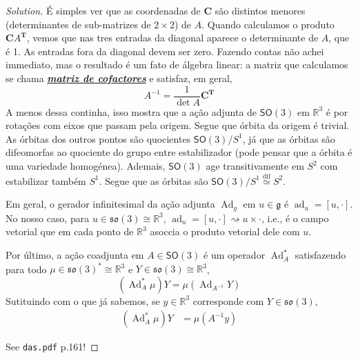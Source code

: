 \begin{proof}[Solution]
É simples ver que as coordenadas de $\mathbf{C}$ são distintos menores (determinantes de sub-matrizes de $2\times 2$) de $A$. Quando calculamos o produto $\mathbf{C} A^{\mathbf{T}}$, vemos que nas tres entradas da diagonal aparece o determinante de $A$, que é 1. As entradas fora da diagonal devem ser zero. Fazendo contas não achei immediato, mas o resultado é um fato de álgebra linear: a matriz que calculamos se chama \href{https://en.wikipedia.org/wiki/Minor_(linear_algebra)#Cofactor_expansion_of_the_determinant}{\textit{\textbf{matriz de cofactores}}} e satisfaz, em geral,
\[A^{-1}=\frac{1}{\det A}\mathbf{C}^{\mathbf{T}}\]
A menos dessa continha, isso mostra que a ação adjunta de $\mathsf{SO}(3)$ em $\mathbb{R}^{3}$ é por rotações com eixos que passam pela origem. Segue que órbita da origem é trivial. As órbitas dos outros pontos são quocientes $\mathsf{SO}(3)/S^1$, já que as órbitas são difeomorfas ao quociente do grupo entre estabilizador (pode pensar que a órbita é uma variedade homogénea). Ademais, $\mathsf{SO}(3)$ age transitivamente em $S^2$ com estabilizar também $S^1$. Segue que as órbitas são $\mathsf{SO}(3)/S^1\overset{\operatorname{dif}}{\simeq} S^2$.

Em geral, o gerador infinitesimal da ação adjunta $\operatorname{Ad}_g$ em $u\in\mathfrak{g}$ é $\operatorname{ad}_u=[u,\cdot]$. No nosso caso, para $u\in\mathfrak{so}(3) \cong \mathbb{R}^{3}$, $\operatorname{ad}_u=[u,\cdot ]\rightsquigarrow u\times \cdot$, i.e., é o campo vetorial que em cada ponto de $\mathbb{R}^{3}$ asoccia o produto vetorial dele com $u$.

Por último, a ação coadjunta em $A\in\mathsf{SO}(3)$ é um operador $\operatorname{Ad}^*_A$ satisfazendo para todo $\mu\in  \mathfrak{so}(3)^* \cong \mathbb{R}^{3}$ e $Y\in \mathfrak{so}(3) \cong \mathbb{R}^{3}$,
\[(\operatorname{Ad}^* _A\mu)Y=\mu(\operatorname{Ad}_{A^{-1}}Y)\]
Sutituindo com o que já sabemos, se $y\in \mathbb{R}^{3}$ corresponde com  $Y\in\mathfrak{so}(3)$,
\begin{align*}
	(\operatorname{Ad}^*_A\mu)Y&=\mu(A^{-1}y)
\end{align*}

{\color{3}See \texttt{das.pdf} p.161!}

\end{proof}

